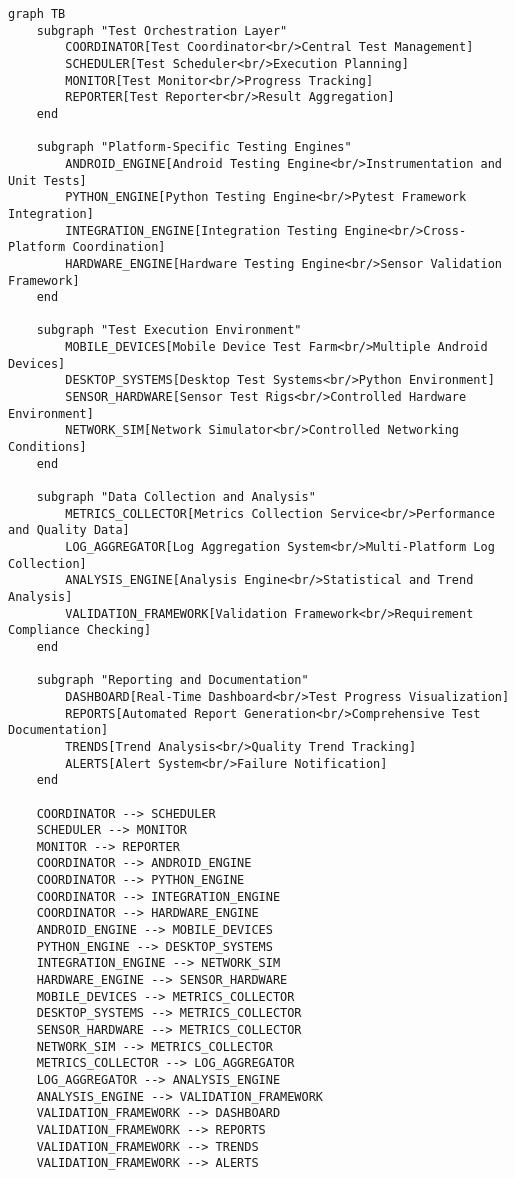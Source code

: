 \documentclass[12pt,a4paper]{report}
\begin{document}
\begin{verbatim}
graph TB
    subgraph "Test Orchestration Layer"
        COORDINATOR[Test Coordinator<br/>Central Test Management]
        SCHEDULER[Test Scheduler<br/>Execution Planning]
        MONITOR[Test Monitor<br/>Progress Tracking]
        REPORTER[Test Reporter<br/>Result Aggregation]
    end

    subgraph "Platform-Specific Testing Engines"
        ANDROID_ENGINE[Android Testing Engine<br/>Instrumentation and Unit Tests]
        PYTHON_ENGINE[Python Testing Engine<br/>Pytest Framework Integration]
        INTEGRATION_ENGINE[Integration Testing Engine<br/>Cross-Platform Coordination]
        HARDWARE_ENGINE[Hardware Testing Engine<br/>Sensor Validation Framework]
    end

    subgraph "Test Execution Environment"
        MOBILE_DEVICES[Mobile Device Test Farm<br/>Multiple Android Devices]
        DESKTOP_SYSTEMS[Desktop Test Systems<br/>Python Environment]
        SENSOR_HARDWARE[Sensor Test Rigs<br/>Controlled Hardware Environment]
        NETWORK_SIM[Network Simulator<br/>Controlled Networking Conditions]
    end

    subgraph "Data Collection and Analysis"
        METRICS_COLLECTOR[Metrics Collection Service<br/>Performance and Quality Data]
        LOG_AGGREGATOR[Log Aggregation System<br/>Multi-Platform Log Collection]
        ANALYSIS_ENGINE[Analysis Engine<br/>Statistical and Trend Analysis]
        VALIDATION_FRAMEWORK[Validation Framework<br/>Requirement Compliance Checking]
    end

    subgraph "Reporting and Documentation"
        DASHBOARD[Real-Time Dashboard<br/>Test Progress Visualization]
        REPORTS[Automated Report Generation<br/>Comprehensive Test Documentation]
        TRENDS[Trend Analysis<br/>Quality Trend Tracking]
        ALERTS[Alert System<br/>Failure Notification]
    end

    COORDINATOR --> SCHEDULER
    SCHEDULER --> MONITOR
    MONITOR --> REPORTER
    COORDINATOR --> ANDROID_ENGINE
    COORDINATOR --> PYTHON_ENGINE
    COORDINATOR --> INTEGRATION_ENGINE
    COORDINATOR --> HARDWARE_ENGINE
    ANDROID_ENGINE --> MOBILE_DEVICES
    PYTHON_ENGINE --> DESKTOP_SYSTEMS
    INTEGRATION_ENGINE --> NETWORK_SIM
    HARDWARE_ENGINE --> SENSOR_HARDWARE
    MOBILE_DEVICES --> METRICS_COLLECTOR
    DESKTOP_SYSTEMS --> METRICS_COLLECTOR
    SENSOR_HARDWARE --> METRICS_COLLECTOR
    NETWORK_SIM --> METRICS_COLLECTOR
    METRICS_COLLECTOR --> LOG_AGGREGATOR
    LOG_AGGREGATOR --> ANALYSIS_ENGINE
    ANALYSIS_ENGINE --> VALIDATION_FRAMEWORK
    VALIDATION_FRAMEWORK --> DASHBOARD
    VALIDATION_FRAMEWORK --> REPORTS
    VALIDATION_FRAMEWORK --> TRENDS
    VALIDATION_FRAMEWORK --> ALERTS
\end{verbatim}
\end{document}
